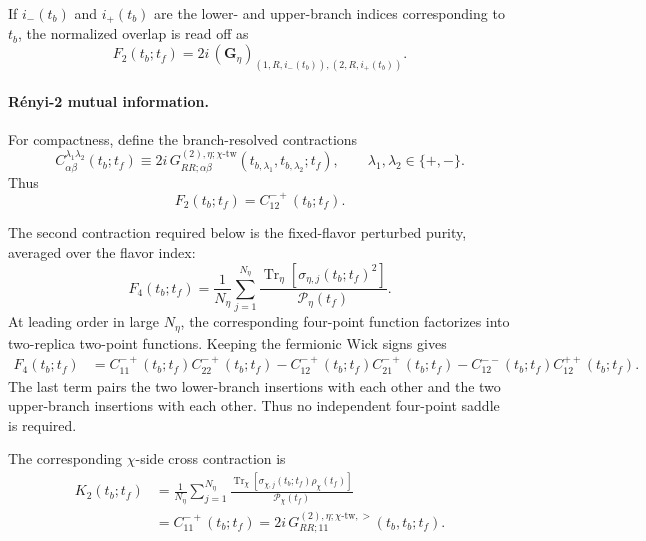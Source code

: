 \documentclass[11pt,a4paper]{article}
\begin{document}
If \(i_-(t_b)\) and \(i_+(t_b)\) are the lower- and upper-branch indices
corresponding to \(t_b\), the normalized overlap is read off as
\begin{equation}
  F_2(t_b;t_f)
  =
  2i\,
  (\mathbf G_\eta)_{
  (1,R,i_-(t_b)),
  (2,R,i_+(t_b))
  }.
\label{eq:S5-discrete-F2-readout}
\end{equation}

\paragraph*{R\'enyi-2 mutual information.}

For compactness, define the branch-resolved contractions
\begin{equation}
  C_{\alpha\beta}^{\lambda_1\lambda_2}(t_b;t_f)
  \equiv
  2i\,
  G^{(2),\eta;\chi\text{-tw}}_{RR;\alpha\beta}
  (t_{b,\lambda_1},t_{b,\lambda_2};t_f),
  \qquad
  \lambda_1,\lambda_2\in\{+,-\}.
\label{eq:S5-branch-contractions}
\end{equation}
Thus
\begin{equation}
  F_2(t_b;t_f)
  =
  C_{12}^{-+}(t_b;t_f).
\label{eq:S5-F2-C}
\end{equation}

The second contraction required below is the fixed-flavor perturbed purity,
averaged over the flavor index:
\begin{equation}
  F_4(t_b;t_f)
  =
  \frac{1}{N_\eta}
  \sum_{j=1}^{N_\eta}
  \frac{
  \operatorname{Tr}_{\eta}
  \left[
  \sigma_{\eta,j}(t_b;t_f)^2
  \right]
  }{
  \mathcal P_\eta(t_f)
  } .
\label{eq:S5-F4-density}
\end{equation}
At leading order in large \(N_\eta\), the corresponding four-point
function factorizes into two-replica two-point functions. Keeping the
fermionic Wick signs gives
\begin{equation}
\begin{aligned}
  F_4(t_b;t_f)
  &=
  C_{11}^{-+}(t_b;t_f)
  C_{22}^{-+}(t_b;t_f)
  -
  C_{12}^{-+}(t_b;t_f)
  C_{21}^{-+}(t_b;t_f)
  -
  C_{12}^{--}(t_b;t_f)
  C_{12}^{++}(t_b;t_f).
\end{aligned}
\label{eq:S5-F4-green}
\end{equation}
The last term pairs the two lower-branch insertions with each other and the
two upper-branch insertions with each other. Thus no independent four-point
saddle is required.

The corresponding \(\chi\)-side cross contraction is
\begin{equation}
\begin{aligned}
  K_2(t_b;t_f)
  &=
  \frac{1}{N_\eta}
  \sum_{j=1}^{N_\eta}
  \frac{
  \operatorname{Tr}_{\chi}
  \left[
  \sigma_{\chi,j}(t_b;t_f)
   \rho_\chi(t_f)
  \right]
  }{
  \mathcal P_\chi(t_f)
  }
  \\
  &=
  C_{11}^{-+}(t_b;t_f)
  =
  2i\,
  G^{(2),\eta;\chi\text{-tw},>}_{RR;11}
  (t_b,t_b;t_f).
\end{aligned}
\label{eq:S5-K2}
\end{equation}
\end{document}
